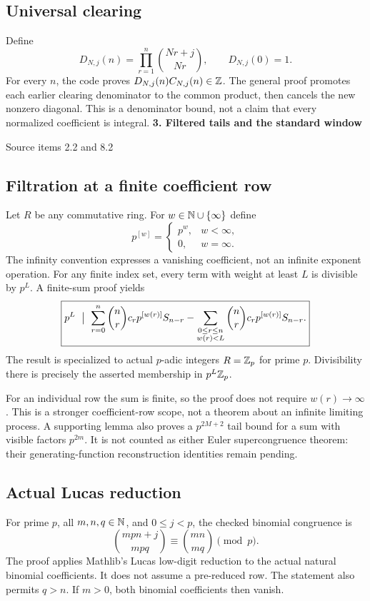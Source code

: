 \documentclass[11pt]{article}
\newcommand{\pageheading}[2]{{\Large\bfseries\color{ink}#1}\par{\small #2}\par\medskip}
\begin{document}
\subsection*{Universal clearing}
Define
\[
 D_{N,j}(n)=\prod_{r=1}^{n}\binom{Nr+j}{Nr},\qquad D_{N,j}(0)=1.
\]
For every $n$, the code proves $D_{N,j}(n)C_{N,j}(n)\in\mathbb Z$. The general proof promotes each earlier clearing denominator to the common product, then cancels the new nonzero diagonal. This is a denominator bound, not a claim that every normalized coefficient is integral.
\newpage
\pageheading{3. Filtered tails and the standard window}{Source items 2.2 and 8.2}
\subsection*{Filtration at a finite coefficient row}
Let $R$ be any commutative ring. For $w\in\mathbb N\cup\{\infty\}$ define
\[
 p^{[w]}=\begin{cases}p^w,&w<\infty,\\0,&w=\infty.\end{cases}
\]
The infinity convention expresses a vanishing coefficient, not an infinite exponent operation. For any finite index set, every term with weight at least $L$ is divisible by $p^L$. A finite-sum proof yields
\[
 \boxed{p^L\ \bigm|\ 
 \sum_{r=0}^{n}\binom nr c_rp^{[w(r)]}S_{n-r}
 -\sum_{\substack{0\le r\le n\\w(r)<L}}
     \binom nr c_rp^{[w(r)]}S_{n-r}.}
\]
The result is specialized to actual $p$-adic integers $R=\mathbb Z_p$ for prime $p$. Divisibility there is precisely the asserted membership in $p^L\mathbb Z_p$.

For an individual row the sum is finite, so the proof does not require $w(r)\to\infty$. This is a stronger coefficient-row scope, not a theorem about an infinite limiting process. A supporting lemma also proves a $p^{2M+2}$ tail bound for a sum with visible factors $p^{2m}$. It is not counted as either Euler supercongruence theorem: their generating-function reconstruction identities remain pending.

\subsection*{Actual Lucas reduction}
For prime $p$, all $m,n,q\in\mathbb N$, and $0\le j<p$, the checked binomial congruence is
\[
 \boxed{\binom{mpn+j}{mpq}\equiv\binom{mn}{mq}\pmod p.}
\]
The proof applies Mathlib's Lucas low-digit reduction to the actual natural binomial coefficients. It does not assume a pre-reduced row. The statement also permits $q>n$. If $m>0$, both binomial coefficients then vanish.
\end{document}
